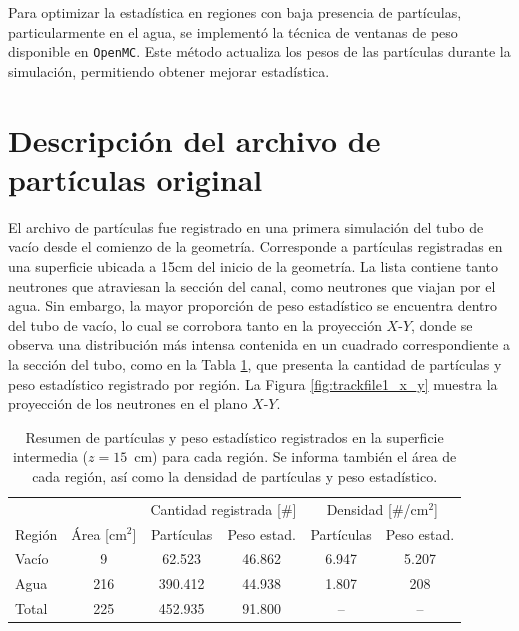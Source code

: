 Para optimizar la estadística en regiones con baja presencia de partículas, particularmente en el agua, se implementó la técnica de ventanas de peso disponible en \texttt{OpenMC}. Este método actualiza los pesos de las partículas durante la simulación, permitiendo obtener mejorar estadística.

\section{Descripción del archivo de partículas original} 

El archivo de partículas fue registrado en una primera simulación del tubo de vacío desde el comienzo de la geometría. Corresponde a partículas registradas en una superficie ubicada a 15cm del inicio de la geometría. La lista contiene tanto neutrones que atraviesan la sección del canal, como neutrones que viajan por el agua. Sin embargo, la mayor proporción de peso estadístico se encuentra dentro del tubo de vacío, lo cual se corrobora tanto en la proyección $X$-$Y$, donde se observa una distribución más intensa contenida en un cuadrado correspondiente a la sección del tubo, como en la Tabla \ref{tab:particulas_pesos}, que presenta la cantidad de partículas y peso estadístico registrado por región. La Figura \ref{fig:trackfile1_x_y} muestra la proyección de los neutrones en el plano $X$-$Y$.

\begin{table}[H]
    \centering
    \begin{tabular}{lccccc}
        \toprule
        & & \multicolumn{2}{c}{Cantidad registrada [\#]} & \multicolumn{2}{c}{Densidad [\#/cm$^2$]} \\
        \cmidrule(lr){3-4} \cmidrule(lr){5-6}
        Región & Área [cm$^2$] & Partículas & Peso estad. & Partículas & Peso estad. \\
        \midrule
        Vacío & 9 & 62.523 & 46.862 & 6.947 & 5.207 \\
        Agua  & 216 & 390.412 & 44.938 & 1.807 & 208 \\
        \midrule
        Total & 225 & 452.935 & 91.800 & -- & -- \\
        \bottomrule
    \end{tabular}
    \caption{Resumen de partículas y peso estadístico registrados en la superficie intermedia ($z = 15$~cm) para cada región. Se informa también el área de cada región, así como la densidad de partículas y peso estadístico.}
    \label{tab:particulas_pesos}
\end{table}


